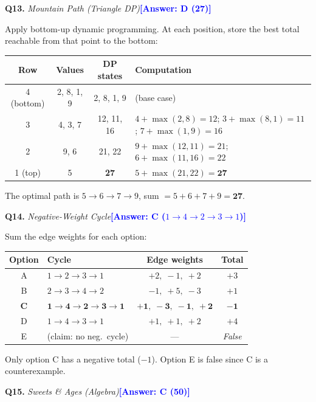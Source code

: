 \documentclass[a4paper,12pt]{article}
\newcommand{\ans}[1]{\textcolor{blue}{\textbf{[Answer: #1]}}}
\newcommand{\qsol}[3]{%
  \vspace{1.5ex}%
  \noindent\textbf{Q#1.} \textit{#2}\quad\ans{#3}%
  \par\vspace{0.4ex}%
}
\begin{document}
\qsol{13}{Mountain Path (Triangle DP)}{D (27)}

Apply bottom-up dynamic programming. At each position, store the best total
reachable from that point to the bottom:

\medskip
\begin{center}
\begin{tabular}{cccl}
\toprule
Row & Values & DP states & Computation \\
\midrule
4 (bottom) & 2, 8, 1, 9 & 2, 8, 1, 9 & (base case) \\
3 & 4, 3, 7 & 12, 11, 16 &
  $4{+}\max(2,8)=12$;\; $3{+}\max(8,1)=11$;\; $7{+}\max(1,9)=16$ \\
2 & 9, 6 & 21, 22 &
  $9{+}\max(12,11)=21$;\; $6{+}\max(11,16)=22$ \\
1 (top) & 5 & \textbf{27} & $5+\max(21,22)=\mathbf{27}$ \\
\bottomrule
\end{tabular}
\end{center}
\medskip

The optimal path is $5\to6\to7\to9$, sum $= 5+6+7+9 = \mathbf{27}$.

\qsol{14}{Negative-Weight Cycle}{C ($1\!\to\!4\!\to\!2\!\to\!3\!\to\!1$)}

Sum the edge weights for each option:

\begin{center}
\begin{tabular}{clcc}
  \toprule
  Option & Cycle & Edge weights & Total \\
  \midrule
  A & $1\to2\to3\to1$       & $+2,\;-1,\;+2$         & $+3$ \\
  B & $2\to3\to4\to2$       & $-1,\;+5,\;-3$         & $+1$ \\
  \textbf{C} & $\mathbf{1\to4\to2\to3\to1}$ &
    $\mathbf{+1,\;-3,\;-1,\;+2}$ & $\mathbf{-1}$ \\
  D & $1\to4\to3\to1$       & $+1,\;+1,\;+2$         & $+4$ \\
  E & (claim: no neg.\ cycle) & --- & \emph{False} \\
  \bottomrule
\end{tabular}
\end{center}

Only option C has a negative total ($-1$). Option E is false since C is a
counterexample.

\qsol{15}{Sweets \& Ages (Algebra)}{C (50)}
\end{document}
